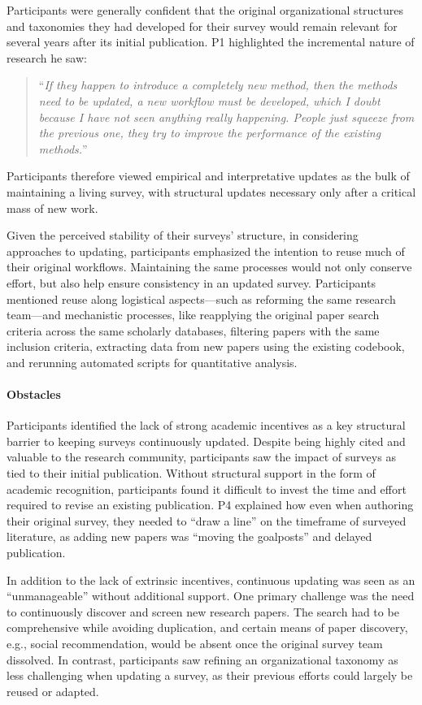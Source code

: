 Participants were generally confident that the original organizational structures and taxonomies they had developed for their survey would remain relevant for several years after its initial publication. P1 highlighted the incremental nature of research he saw:
\begin{quote}
    ``\textit{If they happen to introduce a completely new method, then the methods need to be updated, a new workflow must be developed, which I doubt because I have not seen anything really happening. People just squeeze from the previous one, they try to improve the performance of the existing methods.}''
\end{quote}
Participants therefore viewed empirical and interpretative updates as the bulk of maintaining a living survey, with structural updates necessary only after a critical mass of new work.

Given the perceived stability of their surveys' structure, in considering approaches to updating, participants emphasized the intention to reuse much of their original workflows. Maintaining the same processes would not only conserve effort, but also help ensure consistency in an updated survey. Participants mentioned reuse along logistical aspects---such as reforming the same research team---and mechanistic processes, like reapplying the original paper search criteria across the same scholarly databases, filtering papers with the same inclusion criteria, extracting data from new papers using the existing codebook, and rerunning automated scripts for quantitative analysis.
\paragraph{\textbf{Obstacles}}
Participants identified the lack of strong academic incentives as a key structural barrier to keeping surveys continuously updated. Despite being highly cited and valuable to the research community, participants saw the impact of surveys as tied to their initial publication. Without structural support in the form of academic recognition, participants found it difficult to invest the time and effort required to revise an existing publication. P4 explained how even when authoring their original survey, they needed to ``draw a line'' on the timeframe of surveyed literature, as adding new papers was ``moving the goalposts'' and delayed publication.

In addition to the lack of extrinsic incentives, continuous updating was seen as an ``unmanageable'' without additional support. One primary challenge was the need to continuously discover and screen new research papers. The search had to be comprehensive while avoiding duplication, and certain means of paper discovery, e.g., social recommendation, would be absent once the original survey team dissolved. In contrast, participants saw refining an organizational taxonomy as less challenging when updating a survey, as their previous efforts could largely be reused or adapted.


